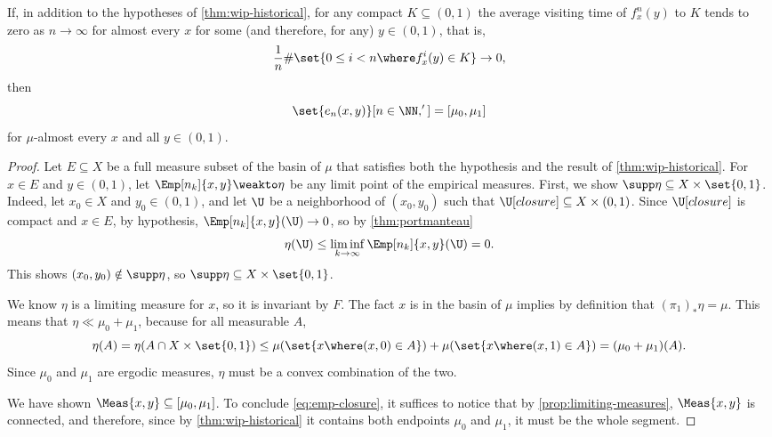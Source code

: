 \documentclass[../main]{subfiles}
\begin{document}
\begin{corollary}\label{col:histo-avoid-compacts}
  If, in addition to the hypotheses of \cref{thm:wip-historical}, for any compact \(K \subseteq (0,1)\) the average visiting time of \(f^n_x(y)\) to \(K\) tends to zero as \(n \to \infty\) for almost every \(x\) for some (and therefore, for any) \(y \in (0,1)\), that is,
  \begin{equation*}
    \frac{1}{n}\#\set{ 0 \le i < n \where f^i_x(y) \in K} \to 0,
  \end{equation*}
  then
  \begin{equation}\label{eq:4}
    \set{e_n(x,y)}[n \in \NN, '] = [\mu_0, \mu_1]
  \end{equation}
  for \(\mu\)-almost every \(x\) and all \(y \in (0,1)\).
\end{corollary}

\begin{proof}
  Let \(E \subseteq X\) be a full measure subset of the basin of \(\mu\) that satisfies both the hypothesis and the result of \cref{thm:wip-historical}. For \(x \in E\) and \(y \in (0,1)\), let \(\Emp[n_k]{x,y} \weakto \eta\) be any limit point of the empirical measures. First, we show \(\supp \eta \subseteq X \times \set{0,1}\). Indeed, let \(x_0 \in X\) and \(y_0 \in (0,1)\), and let \(\U\) be a neighborhood of \((x_0,y_0)\) such that \(\U[closure] \subseteq X \times (0,1)\). Since \(\U[closure]\) is compact and \(x \in E\), by hypothesis, \(\Emp[n_k]{x,y}(\U) \to 0\), so by \cref{thm:portmanteau}
  \begin{equation*}
    \eta(\U) \leq \liminf_{k \to \infty} \Emp[n_k]{x,y}(\U) = 0.
  \end{equation*}
  This shows \((x_0,y_0) \notin \supp \eta\), so \(\supp \eta \subseteq X \times \set{0,1}\).

  We know \(\eta\) is a limiting measure for \(x\), so it is invariant by \(F\). The fact \(x\) is in the basin of \(\mu\) implies by definition that \((\pi_1)_* \eta = \mu\). This means that \(\eta \ll \mu_0 + \mu_1\), because for all measurable \(A\),
  \[\eta(A) = \eta(A \cap X \times \set{0,1})\le \mu(\set{x \where (x,0) \in A}) + \mu(\set{x \where (x,1) \in A}) = (\mu_0 + \mu_1)(A).\]
  Since \(\mu_0\) and \(\mu_1\) are ergodic measures, \(\eta\) must be a convex combination of the two.

  We have shown \(\Meas{x,y} \subseteq [\mu_0,\mu_1]\). To conclude \cref{eq:emp-closure}, it suffices to notice that by \cref{prop:limiting-measures}, \(\Meas{x,y}\) is connected, and therefore, since by \cref{thm:wip-historical} it contains both endpoints \(\mu_0\) and \(\mu_1\), it must be the whole segment.
\end{proof}
\end{document}
